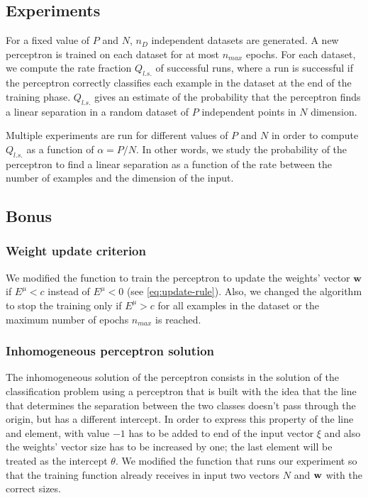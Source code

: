 \subsection{Experiments}
For a fixed value of $P$ and $N$, $n_D$ independent datasets are generated.
A new perceptron is trained on each dataset for at most $n_{max}$ epochs.
For each dataset, we compute the rate fraction $Q_{l.s.}$ of successful runs, where a run is successful if the perceptron correctly classifies each example in the dataset at the end of the training phase.
$Q_{l.s.}$ gives an estimate of the probability that the perceptron finds a linear separation in a random dataset of $P$ independent points in $N$ dimension.

Multiple experiments are run for different values of $P$ and $N$ in order to compute $Q_{l.s.}$ as a function of $\alpha = P / N$.
In other words, we study the probability of the perceptron to find a linear separation as a function of the rate between the number of examples and the dimension of the input.

\subsection{Bonus}
\subsubsection{Weight update criterion}
We modified the function to train the perceptron to update the weights' vector $\mathsf{\bm{w}}$ if $E^\mu < c$ instead of $E^\mu < 0$ (see \cref{eq:update-rule}).
Also, we changed the algorithm to stop the training only if $E^{\mu} > c$ for all examples in the dataset or the maximum number of epochs $n_{max}$ is reached.

\subsubsection{Inhomogeneous perceptron solution}
The inhomogeneous solution of the perceptron consists in the solution of the classification problem using a perceptron that is built with the idea that the line that determines
the separation between the two classes doesn't pass through the origin, but has a different intercept. In order to express this property of the line and element, with value $-1$ has to be added to
end of the input vector $\xi$ and also the weights' vector size has to be increased by one; the last element will be treated as the intercept $\theta$. We modified the function that runs
our experiment so that the training function already receives in input two vectors $N$ and $\mathsf{\bf{w}}$ with the correct sizes.